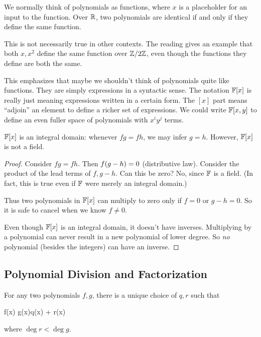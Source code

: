 \begin{remark}
  We normally think of polynomials as functions, where $x$ is a
  placeholder for an input to the function. Over $\mathbb{R}$, two polynomials
  are identical if and only if they define the same function.

  This is not necessarily true in other contexts. The reading gives an
  example that both $x, x^2$ define the same function over $\mathbb{Z} / 2\mathbb{Z}$,
  even though the functions they define are both the same.

  This emphasizes that maybe we shouldn't think of polynomials quite
  like functions. They are simply expressions in a syntactic sense. The
  notation $\mathbb{F}[x]$ is really just meaning expressions written in a
  certain form. The $[x]$ part means ``adjoin'' an element to define a
  richer set of expressions. We could write $\mathbb{F}[x, y]$ to define an even
  fuller space of polynomials with $x^i y^j$ terms.
\end{remark}

\begin{proposition}
  $\mathbb{F}[x]$ is an integral domain: whenever $fg = fh$, we may infer $g =
  h$. However, $\mathbb{F}[x]$ is not a field.
\end{proposition}

\begin{proof}
  Consider $fg = fh$. Then $f \mathopen{}\left( {g - h} \right)\mathclose{} = 0$ (distributive law).
  Consider the product of the lead terms of $f, g-h$. Can this be zero?
  No, since $\mathbb{F}$ is a field. (In fact, this is true even if $\mathbb{F}$ were
  merely an integral domain.)

  Thus two polynomials in $\mathbb{F}[x]$ can multiply to zero only if $f = 0$
  or $g - h = 0$. So it is safe to cancel when we know $f \ne 0$.

  Even though $\mathbb{F}[x]$ is an integral domain, it doesn't have inverses.
  Multiplying by a polynomial can never result in a new polynomial of
  lower degree. So \emph{no} polynomial (besides the integers) can have
  an inverse.
\end{proof}

\subsection{Polynomial Division and Factorization}

\begin{theorem}
  For any two polynomials $f, g$, there is a unique choice of $q, r$
  such that

  \begin{nedqn}
    f(x)
  \eqcol
    g(x)q(x) + r(x)
  \end{nedqn}

  \noindent
  where $\deg r < \deg g$.
\end{theorem}

